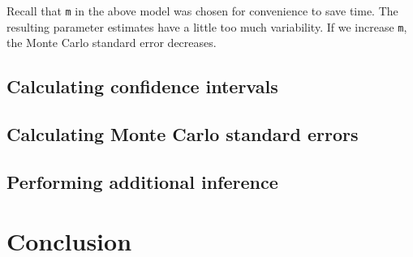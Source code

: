 \documentclass[article]{jss}
\begin{document}
Recall that \texttt{m}  in the above model was chosen for convenience to save time. The resulting parameter estimates have a little too much variability. If we increase \texttt{m}, the Monte Carlo standard error decreases. 


\subsection{Calculating confidence intervals}

\subsection{Calculating Monte Carlo standard errors}

\subsection{Performing additional inference}


\section{Conclusion}


\end{document}
